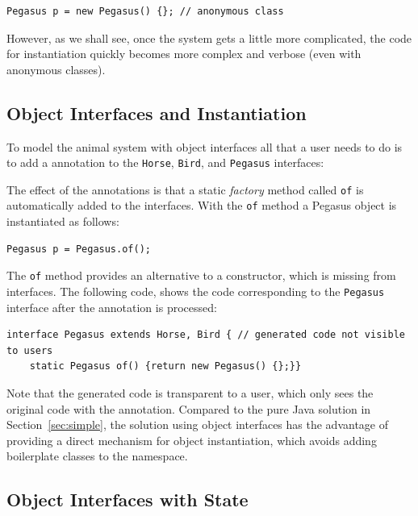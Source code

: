\begin{lstlisting}
Pegasus p = new Pegasus() {}; // anonymous class
\end{lstlisting}

\noindent However, as we shall see, once the system gets a little more
complicated, the code for instantiation quickly becomes more 
complex and verbose (even with anonymous classes). 

\subsection{Object Interfaces and Instantiation} 

To model the animal system with object interfaces all that a user
needs to do is to add a \mixinAnn{} annotation to the \texttt{Horse}, 
\texttt{Bird}, and \texttt{Pegasus} interfaces: 


\noindent The effect of the annotations is that a static \emph{factory} method called
\texttt{of} is automatically added to the interfaces. With the
\texttt{of} method a Pegasus object is instantiated as follows:

\begin{lstlisting}
Pegasus p = Pegasus.of();
\end{lstlisting}

\noindent The \texttt{of} method provides an alternative to a
constructor, which is missing from interfaces. The following code,
shows the code corresponding to the \texttt{Pegasus} interface
after the \mixinAnn{} annotation is processed:

\begin{lstlisting}
interface Pegasus extends Horse, Bird { // generated code not visible to users
	static Pegasus of() {return new Pegasus() {};}}
\end{lstlisting}

\noindent Note that the generated code is transparent to a user, which
only sees the original code with the \mixin annotation. Compared to the pure
Java solution in Section~\ref{sec:simple}, the solution using object interfaces
has the advantage of providing a direct mechanism for object
instantiation, which avoids adding boilerplate classes to the
namespace. 

\subsection{Object Interfaces with State}

